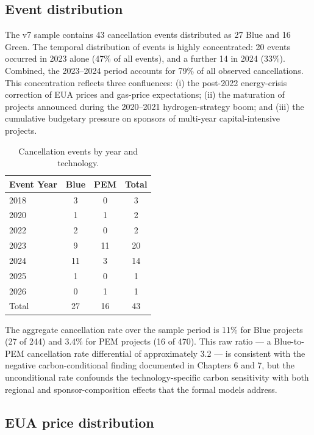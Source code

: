 \documentclass[11pt,a4paper]{article}
\begin{document}
\subsection{Event distribution}

The v7 sample contains 43 cancellation events distributed as 27 Blue and 16 Green. The temporal distribution of events is highly concentrated: 20 events occurred in 2023 alone (47\% of all events), and a further 14 in 2024 (33\%). Combined, the 2023--2024 period accounts for 79\% of all observed cancellations. This concentration reflects three confluences: (i) the post-2022 energy-crisis correction of EUA prices and gas-price expectations; (ii) the maturation of projects announced during the 2020--2021 hydrogen-strategy boom; and (iii) the cumulative budgetary pressure on sponsors of multi-year capital-intensive projects.

\begin{table}[h!]
\centering
\caption{Cancellation events by year and technology.}
\begin{tabular}{lccc}
\toprule
Event Year & Blue & PEM & Total \\
\midrule
2018 & 3 & 0 & 3 \\
2020 & 1 & 1 & 2 \\
2022 & 2 & 0 & 2 \\
2023 & 9 & 11 & 20 \\
2024 & 11 & 3 & 14 \\
2025 & 1 & 0 & 1 \\
2026 & 0 & 1 & 1 \\
\midrule
Total & 27 & 16 & 43 \\
\bottomrule
\end{tabular}
\label{tab:ch4-events-year}
\end{table}

The aggregate cancellation rate over the sample period is 11\% for Blue projects (27 of 244) and 3.4\% for PEM projects (16 of 470). This raw ratio --- a Blue-to-PEM cancellation rate differential of approximately 3.2 --- is consistent with the negative carbon-conditional finding documented in Chapters 6 and 7, but the unconditional rate confounds the technology-specific carbon sensitivity with both regional and sponsor-composition effects that the formal models address.

\subsection{EUA price distribution}
\end{document}
